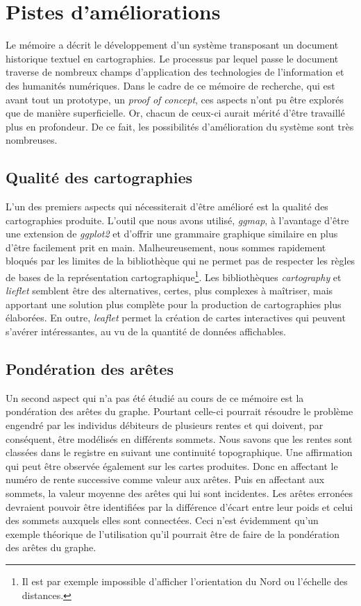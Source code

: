 \section{Pistes d'améliorations}
Le mémoire a décrit le développement d'un système transposant un document historique textuel en cartographies. Le processus par lequel passe le document traverse de nombreux champs d'application des technologies de l'information et des humanités numériques. Dans le cadre de ce  mémoire de recherche, qui est avant tout un prototype, un \textit{proof of concept}, ces aspects n'ont pu être explorés que de manière  superficielle.  Or, chacun de ceux-ci aurait mérité d'être travaillé plus en profondeur. De ce fait, les possibilités d'amélioration du système sont très nombreuses.

\subsection{Qualité des cartographies}
L'un des premiers aspects qui nécessiterait d'être amélioré est la qualité des cartographies produite. L'outil que nous avons utilisé, \textit{ggmap}, à l'avantage d'être une extension de \textit{ggplot2} et d'offrir une grammaire graphique similaire en plus d'être facilement prit en main. Malheureusement, nous sommes rapidement bloqués par les limites de la bibliothèque qui ne permet pas de respecter les règles de bases de la représentation cartographique\footnote{Il est par exemple impossible d'afficher l'orientation du Nord ou l'échelle des distances.}. 
Les bibliothèques \textit{cartography} et \textit{lieflet} semblent être des alternatives, certes, plus complexes à maîtriser, mais apportant une solution plus complète pour la production de cartographies plus élaborées.
En outre, \textit{leaflet} permet la création de cartes interactives qui peuvent s'avérer intéressantes, au vu de la quantité de données affichables.

\subsection{Pondération des arêtes}
Un second aspect qui n'a pas été étudié au cours de ce mémoire est la pondération des arêtes du graphe. Pourtant celle-ci pourrait résoudre le problème engendré par les individus débiteurs de plusieurs rentes et qui doivent, par conséquent,  être modélisés en différents sommets. Nous savons que les rentes sont classées dans le registre en suivant une continuité topographique. Une affirmation qui peut être observée également sur les cartes  produites. 
Donc en affectant le numéro de rente successive comme valeur aux arêtes. Puis en affectant aux sommets, la valeur moyenne des arêtes qui lui sont incidentes. Les arêtes erronées devraient pouvoir être identifiées par la différence d'écart entre leur poids et celui des sommets auxquels elles sont connectées. Ceci n'est évidemment qu'un exemple théorique de l'utilisation qu'il pourrait être de faire de la pondération des arêtes du graphe.

